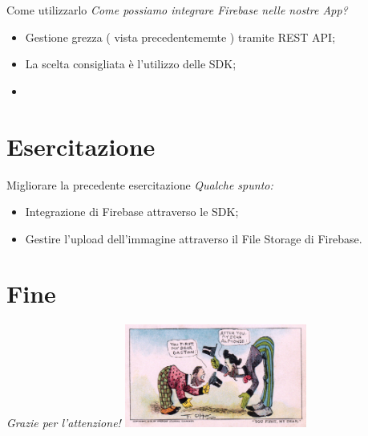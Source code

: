 \documentclass{../libs/presentation_format}
\begin{document}

\begin{frame}{Come utilizzarlo}
	\emph{Come possiamo integrare Firebase nelle nostre App?}
	\begin{itemize}
		\item Gestione grezza ( vista precedentememte ) tramite REST API;
		\item La scelta consigliata è l'utilizzo delle SDK;
		\item \href{https://firebase.google.com/docs/flutter/setup?platform=android}{}
	\end{itemize}
\end{frame}


\section{Esercitazione}
\begin{frame}{Migliorare la precedente esercitazione}
	\emph{Qualche spunto:}
	\begin{itemize}
		\item Integrazione di Firebase attraverso le SDK;
		\item Gestire l'upload dell'immagine attraverso il File Storage di Firebase.
	\end{itemize}
\end{frame}



\section{Fine}
\begin{frame}{}
	\huge\emph{Grazie per l'attenzione!}
	\newline
	\vfill
	\hfill\includegraphics[width=6cm]{../libs/alphonse-gaston-regards}
\end{frame}
\end{document}
